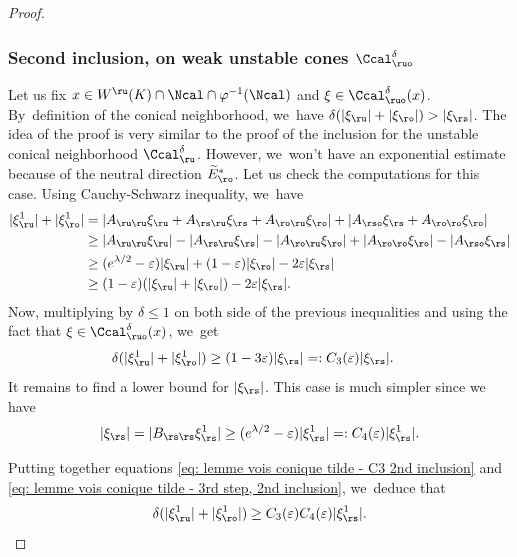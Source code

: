 \begin{proof}
\subsubsection*{Second inclusion, on weak unstable cones $\Ccal_{\ruo}^{\delta}$} Let us fix $x \in W^\ru (K) \cap \Ncal \cap \varphi^{-1}(\Ncal) $ and $\xi \in \Ccal_{\ruo}^{\delta} (x)$. By~definition of the conical neighborhood, we~have $\delta (|\xi_\ru| + |\xi_\ro|) > |\xi_\rs| $. The idea of the proof is very similar to the proof of the inclusion for the unstable conical neighborhood $\Ccal_{\ru}^{\delta}$. However, we~won't have an exponential estimate because of the neutral direction $\widetilde{E}_\ro^*$. Let us check the computations for this case. Using Cauchy-Schwarz inequality, we~have
\begin{align*}
|\xi_\ru^1| + |\xi_\ro^1| &= |A_{\ru\ru} \xi_\ru + A_{\rs\ru} \xi_\rs + A_{\ro\ru} \xi_\ro | + |A_{\rso} \xi_\rs + A_{\ro\ro} \xi_\ro | \\
&\geq |A_{\ru\ru} \xi_\ru| - |A_{\rs\ru} \xi_\rs| - |A_{\ro\ru} \xi_\ro | + | A_{\ro\ro} \xi_\ro | - | A_{\rso} \xi_\rs |\\
&\geq (e^{\lambda/2} - \varepsilon)|\xi_\ru| + (1 - \varepsilon) |\xi_\ro| - 2\varepsilon|\xi_\rs| \\
&\geq (1 - \varepsilon) (|\xi_\ru| + |\xi_\ro|) - 2\varepsilon |\xi_\rs|.
\end{align*}
Now, multiplying by $\delta \leq 1$ on both side of the previous inequalities and using the fact that $\xi \in \Ccal_{\ruo}^{\delta} (x)$, we~get
\begin{equation}\label{eq: lemme vois conique tilde - C3 2nd inclusion}
\begin{split}
\delta (|\xi_\ru^1| + |\xi_\ro^1|) &\geq (1 - 3\varepsilon) |\xi_\rs| =: C_3 (\varepsilon) |\xi_\rs|.
\end{split}
\end{equation}
It remains to find a lower bound for $|\xi_\rs|$. This case is much simpler since we have
\begin{align}\label{eq: lemme vois conique tilde - 3rd step, 2nd inclusion}
|\xi_\rs| = |B_{\rs\rs} \xi_\rs^1| \geq (e^{\lambda/2} -\varepsilon) |\xi_\rs^1| =: C_4 (\varepsilon) |\xi_\rs^1|.
\end{align}

Putting together equations \eqref{eq: lemme vois conique tilde - C3 2nd inclusion} and \eqref{eq: lemme vois conique tilde - 3rd step, 2nd inclusion}, we~deduce that
\begin{align*}
\delta(|\xi_\ru^1| + |\xi_\ro^1|) \geq C_3 (\varepsilon) C_4 (\varepsilon) |\xi_\rs^1|.
\end{align*}


\end{proof}

